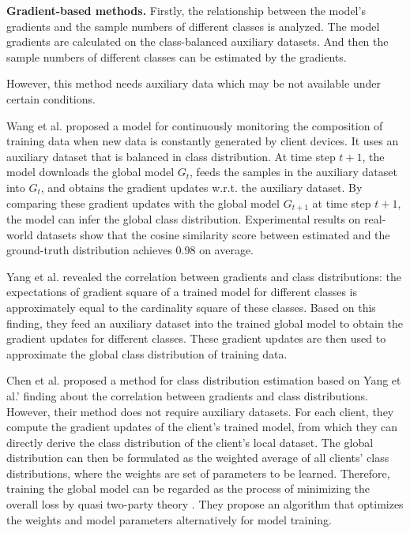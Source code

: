 \documentclass[10pt,journal,compsoc]{IEEEtran}
\begin{document}
\textbf{Gradient-based methods.} Firstly, the relationship between the model's gradients and the sample numbers of different classes is analyzed. The model gradients are calculated on the class-balanced auxiliary datasets. And then the sample numbers of different classes can be estimated by the gradients.

However, this method needs auxiliary data which may be not available under certain conditions.

Wang et al. \cite{wang2021addressing} proposed a model for continuously monitoring the composition of training data when new data is constantly generated by client devices. It uses an auxiliary dataset that is balanced in class distribution. At time step $t+1$, the model downloads the global model $G_t$, feeds the samples in the auxiliary dataset into $G_t$, and obtains the gradient updates w.r.t. the auxiliary dataset. By comparing these gradient updates with the global model $G_{t+1}$ at time step $t+1$, the model can infer the global class distribution. Experimental results on real-world datasets show that the cosine similarity score between estimated and the ground-truth distribution achieves 0.98 on average. 

Yang et al. \cite{yang2021federated} revealed the correlation between gradients and class distributions: the expectations of gradient square of a trained model for different classes is approximately equal to the cardinality square of these classes. Based on this finding, they feed an auxiliary dataset into the trained global model to obtain the gradient updates for different classes. These gradient updates are then used to approximate the global class distribution of training data. 

Chen et al. \cite{chen2021novel} proposed a method for class distribution estimation based on Yang et al.' finding \cite{yang2021federated} about the correlation between gradients and class distributions. However, their method does not require auxiliary datasets. For each client, they compute the gradient updates of the client's trained model, from which they can directly derive the class distribution of the client's local dataset. The global distribution can then be formulated as the weighted average of all clients' class distributions, where the weights are set of parameters to be learned. Therefore, training the global model can be regarded as the process of minimizing the overall loss by quasi two-party theory \cite{mohri2019agnostic}. They propose an algorithm that optimizes the weights and model parameters alternatively for model training.  
\end{document}

